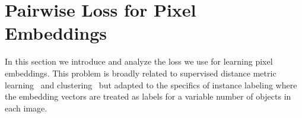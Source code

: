 \documentclass[10pt,twocolumn,letterpaper]{article}
\def\x{{\bf x}}
\def\etal{{\em et al.\/}\,}
\begin{document}
\section{Pairwise Loss for Pixel Embeddings}\label{sec:max-margin}
In this section we introduce and analyze the loss we use for learning pixel
embeddings. This problem is broadly related to supervised distance metric
learning~\cite{weinberger2009distance,kong2012dictionary, kong2013learning} and clustering~\cite{kong2012multi}
but adapted to the specifics of instance labeling where
the embedding vectors are treated as labels for a variable number of objects in
each image.
\end{document}
